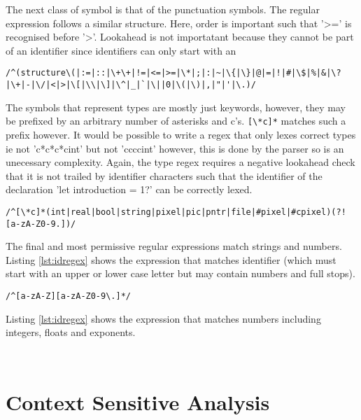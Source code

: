 \documentclass{article}
\begin{document}
The next class of symbol is that of the punctuation symbols. The regular expression follows a similar structure. Here, order is important such that '>=' is recognised before '>'. Lookahead is not importatant because they cannot be part of an identifier since identifiers can only start with an 

\begin{lstlisting}[caption={},label={lst:puncregex}, escapechar="|"]
/^(structure\(|:=|::|\+\+|!=|<=|>=|\*|;|:|~|\{|\}|@|=|!|#|\$|%|&|\?|\+|-|\/|<|>|\[|\\|\]|\^|_|`|\||0|\(|\)|,|"|'|\.)/
\end{lstlisting}

The symbols that represent types are mostly just keywords, however, they may be prefixed by an arbitrary number of asterisks and c's. \lstinline{[\*c]*} matches such a prefix however. It would be possible to write a regex that only lexes correct types ie not 'c*c*c*cint' but not 'ccccint' however, this is done by the parser so is an unecessary complexity. Again, the type regex requires a negative lookahead check that it is not trailed by identifier characters such that the identifier of the declaration 'let introduction = 1?' can be correctly lexed.

\begin{lstlisting}[caption={},label={lst:typeregex}, escapechar="|"]
/^[\*c]*(int|real|bool|string|pixel|pic|pntr|file|#pixel|#cpixel)(?![a-zA-Z0-9.])/
\end{lstlisting}

The final and most permissive regular expressions match strings and numbers. Listing \ref{lst:idregex} shows the expression that matches identifier (which must start with an upper or lower case letter but may contain numbers and full stops).

\begin{lstlisting}[caption={},label={lst:idregex}, escapechar="|"]
/^[a-zA-Z][a-zA-Z0-9\.]*/
\end{lstlisting}

Listing \ref{lst:idregex} shows the expression that matches numbers including integers, floats and exponents.

\begin{lstlisting}[caption={},label={lst:numberregex}, escapechar="|"]
 
\end{lstlisting}

\section{Context Sensitive Analysis}
\end{document}
